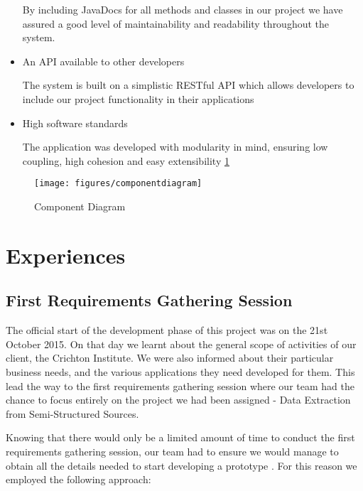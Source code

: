 \documentclass{l3proj}
\begin{document}
\begin{itemize}
    By including JavaDocs for all methods and classes in our project we have assured a good level of maintainability and readability throughout the system.
    
    \item An API available to other developers
    
    The system is built on a simplistic RESTful API which allows developers to include our project functionality in their applications
    
    \item High software standards
    
    The application was developed with modularity in mind, ensuring low coupling, high cohesion and easy extensibility \ref{fig:comp_diagram}

\end{itemize}
\vspace{33pt}
\begin{figure}[h]
    \centering
    \texttt{[image: figures/componentdiagram]}
    \caption{Component Diagram}
    \label{fig:comp_diagram}
\end{figure}

\newpage
\section{Experiences}
\label{sec:expr}
\subsection{First Requirements Gathering Session}
\label{sec:first_req}


The official start of the development phase of this project was on the 21st October 2015. On that day we learnt about the general scope of activities of our client, the Crichton Institute. We were also informed about their particular business needs, and the various applications they need developed for them. This lead the way to the first requirements gathering session where our team had the chance to focus entirely on the project we had been assigned - Data Extraction from Semi-Structured Sources.


Knowing that there would only be a limited amount of time to conduct the first requirements gathering session, our team had to ensure we would manage to obtain all the details needed to start developing a prototype \cite{Requirements-Gathering}. For this reason we employed the following approach:
\end{document}
